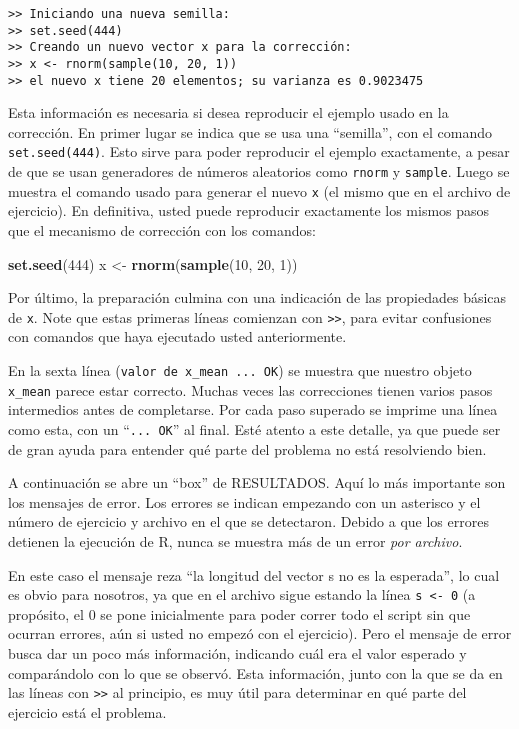 \documentclass[]{article}
\newenvironment{Shaded}{}{}
\newcommand{\KeywordTok}[1]{\textcolor[rgb]{0.00,0.44,0.13}{\textbf{{#1}}}}
\newcommand{\DecValTok}[1]{\textcolor[rgb]{0.25,0.63,0.44}{{#1}}}
\newcommand{\NormalTok}[1]{{#1}}
\begin{document}
\begin{verbatim}
>> Iniciando una nueva semilla:
>> set.seed(444)
>> Creando un nuevo vector x para la corrección:
>> x <- rnorm(sample(10, 20, 1))
>> el nuevo x tiene 20 elementos; su varianza es 0.9023475
\end{verbatim}
Esta información es necesaria si desea reproducir el ejemplo usado en la
corrección. En primer lugar se indica que se usa una ``semilla'', con el
comando \texttt{set.seed(444)}. Esto sirve para poder reproducir el
ejemplo exactamente, a pesar de que se usan generadores de números
aleatorios como \texttt{rnorm} y \texttt{sample}. Luego se muestra el
comando usado para generar el nuevo \texttt{x} (el mismo que en el
archivo de ejercicio). En definitiva, usted puede reproducir exactamente
los mismos pasos que el mecanismo de corrección con los comandos:

\begin{Shaded}
\begin{Highlighting}[]
\KeywordTok{set.seed}\NormalTok{(}\DecValTok{444}\NormalTok{)}
\NormalTok{x <- }\KeywordTok{rnorm}\NormalTok{(}\KeywordTok{sample}\NormalTok{(}\DecValTok{10}\NormalTok{, }\DecValTok{20}\NormalTok{, }\DecValTok{1}\NormalTok{))}
\end{Highlighting}
\end{Shaded}
Por último, la preparación culmina con una indicación de las propiedades
básicas de \texttt{x}. Note que estas primeras líneas comienzan con
\texttt{\textgreater{}\textgreater{}}, para evitar confusiones con
comandos que haya ejecutado usted anteriormente.

En la sexta línea (\texttt{valor de x\_mean ... OK}) se muestra que
nuestro objeto \texttt{x\_mean} parece estar correcto. Muchas veces las
correcciones tienen varios pasos intermedios antes de completarse. Por
cada paso superado se imprime una línea como esta, con un
``\texttt{... OK}'' al final. Esté atento a este detalle, ya que puede
ser de gran ayuda para entender qué parte del problema no está
resolviendo bien.

A continuación se abre un ``box'' de RESULTADOS. Aquí lo más importante
son los mensajes de error. Los errores se indican empezando con un
asterisco y el número de ejercicio y archivo en el que se detectaron.
Debido a que los errores detienen la ejecución de R, nunca se muestra
más de un error \emph{por archivo}.

En este caso el mensaje reza ``la longitud del vector s no es la
esperada'', lo cual es obvio para nosotros, ya que en el archivo sigue
estando la línea \texttt{s \textless{}- 0} (a propósito, el 0 se pone
inicialmente para poder correr todo el script sin que ocurran errores,
aún si usted no empezó con el ejercicio). Pero el mensaje de error busca
dar un poco más información, indicando cuál era el valor esperado y
comparándolo con lo que se observó. Esta información, junto con la que
se da en las líneas con \texttt{\textgreater{}\textgreater{}} al
principio, es muy útil para determinar en qué parte del ejercicio está
el problema.
\end{document}
